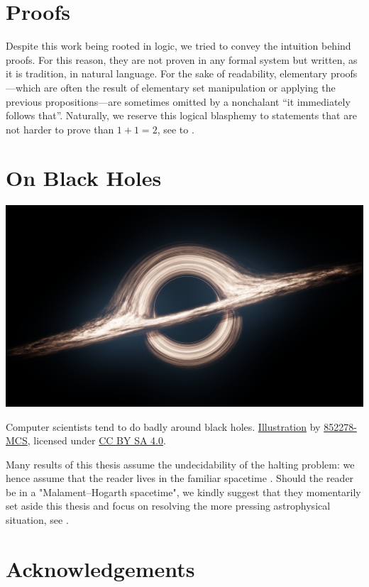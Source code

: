 \section*{Proofs}

Despite this work being rooted in logic,
we tried to convey the intuition behind proofs.
For this reason, they are not proven in any formal system but written, as it is
tradition, in natural language. For the sake of readability, elementary
proofs---which are often the result of elementary set manipulation or applying
the previous propositions---are sometimes omitted by a nonchalant
``it immediately follows that''.
Naturally, we reserve this logical blasphemy to
statements that are not harder to prove than $1+1 = 2$,
see \cite[$\ast$ 54.43]{WhiteheadRussell1910PM1} to \cite[$\ast$ 110.643]{WhiteheadRussell1912PM2}.

\section*{On Black Holes}

\begin{marginfigure}
	\centering
	\includegraphics[width=\linewidth]{fig/intro/black-hole.png}
	\caption{
		\AP\label{fig:preface-black-hole}
		Computer scientists tend to do badly around black holes.
		\href{https://commons.wikimedia.org/wiki/File:Black_Hole_Full.png}{Illustration}
		by \href{https://commons.wikimedia.org/wiki/User:852278-MCS}{852278-MCS},
		licensed under \href{https://creativecommons.org/licenses/by-sa/4.0/deed.en}{CC BY SA 4.0}.
	}
\end{marginfigure}
Many results of this thesis assume the undecidability of the halting problem:
we hence assume that the reader lives in the familiar spacetime \cite{Hogarth1994NonTuring}.
Should the reader be in a "Malament–Hogarth spacetime", we kindly suggest that
they momentarily set aside this thesis and focus on resolving the more pressing
astrophysical situation, see .

\section*{Acknowledgements}

